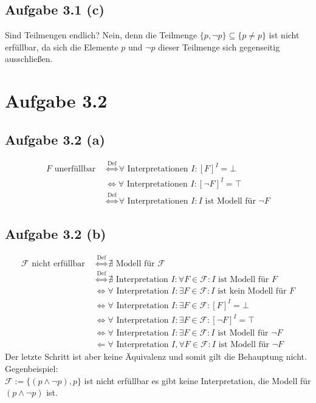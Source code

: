 \documentclass[12pt,a4paper]{article}
\newcommand{\F}{\mathcal{F}}
\begin{document}
\subsection*{Aufgabe 3.1 (c)}
Sind Teilmengen endlich?
Nein, denn die Teilmenge $\lbrace p,\neg p\rbrace \subseteq\lbrace p\neq p\rbrace$ ist nicht erfüllbar, da sich die Elemente $p$ und $\neg p$ dieser Teilmenge sich gegenseitig ausschließen.

\section*{Aufgabe 3.2}
\subsection*{Aufgabe 3.2 (a)}
\begin{align*}
F\text{ unerfüllbar }
&\stackrel{\text{Def}}{\Longleftrightarrow}
\forall\text{ Interpretationen } I:[F]^I=\bot\\
&\stackrel{\text{}}{\Longleftrightarrow}
\forall\text{ Interpretationen } I:[\neg F]^I=\top\\
&\stackrel{\text{Def}}{\Longleftrightarrow}
\forall\text{ Interpretationen } I:I\text{ ist Modell für } \neg F
\end{align*}

\subsection*{Aufgabe 3.2 (b)}
\begin{align*}
\F\text{ nicht erfüllbar }
&\stackrel{\text{Def}}{\Longleftrightarrow}
\nexists\text{ Modell für }\F\\
&\stackrel{\text{Def}}{\Longleftrightarrow}
\nexists\text{ Interpretation }I:\forall F\in\F:I\text{ ist Modell für }F\\
&\stackrel{\text{}}{\Longleftrightarrow}
\forall\text{ Interpretation }I:\exists F\in\F:I\text{ ist kein Modell für } F\\
&\stackrel{\text{}}{\Longleftrightarrow}
\forall\text{ Interpretation }I:\exists F\in\F:[F]^I=\bot\\
&\stackrel{\text{}}{\Longleftrightarrow}
\forall\text{ Interpretation }I:\exists F\in\F:[\neg F]^I=\top\\
&\stackrel{\text{}}{\Longleftrightarrow}
\forall\text{ Interpretation }I:\exists F\in\F:I\text{ ist Modell für }\neg F\\
&\Longleftarrow
\forall\text{ Interpretation } I,\forall F\in\F:I\text{ ist Modell für }\neg F
\end{align*}
Der letzte Schritt ist aber keine Äquivalenz und somit gilt die Behauptung nicht. Gegenbeispiel:\\
$\F:=\lbrace(p\wedge\neg p),p\rbrace$ ist nicht erfüllbar es gibt keine Interpretation, die Modell für $(p\wedge\neg p)$ ist.
\end{document}
